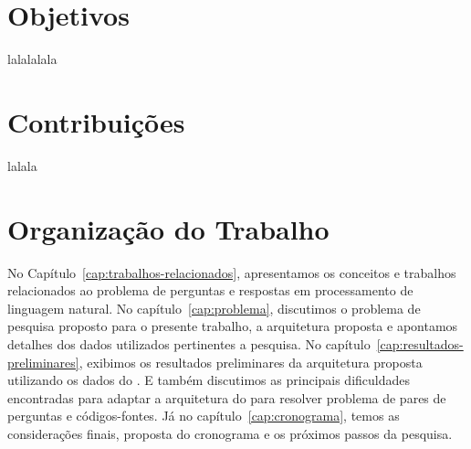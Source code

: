\section{Objetivos}
\label{sec:objetivo}

lalalalala

\section{Contribuições}
\label{sec:contribucoes}

lalala

\section{Organização do Trabalho}
\label{sec:organizacao_trabalho}

No Capítulo~\ref{cap:trabalhos-relacionados}, apresentamos os conceitos e trabalhos relacionados ao problema de perguntas e respostas em processamento de linguagem natural. No capítulo~\ref{cap:problema}, discutimos o problema de pesquisa proposto para o presente trabalho, a arquitetura proposta e apontamos detalhes dos dados utilizados pertinentes a pesquisa. 
No capítulo~\ref{cap:resultados-preliminares}, exibimos os resultados preliminares da arquitetura proposta utilizando os dados do \cite{yao-2018}. E também discutimos as principais dificuldades encontradas para adaptar a arquitetura do \cite{feng-2015} para resolver problema de pares de perguntas e códigos-fontes. Já no capítulo~\ref{cap:cronograma}, temos as considerações finais, proposta do cronograma e os próximos passos da pesquisa.
